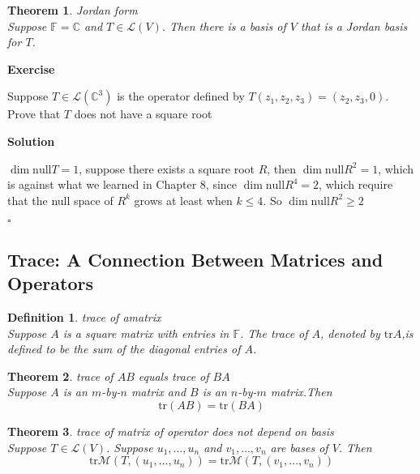 \documentclass{article}
\newtheorem{theorem}{Theorem}[subsection]
\newtheorem{definition}{Definition}[subsection]
\newenvironment{exercise}{%
{\textbf{Exercise\\}
    }
}{
}
\newenvironment{solution}{%
{
    \textbf{Solution\\}
    }
}{
  \hfill $\square$ 
  \par\bigskip 
}
\newcommand{\CC}{\mathbb{C}}
\newcommand{\FF}{\mathbb{F}}
\newcommand{\n}{\text{null}}
\newcommand{\tr}{\text{tr}}
\begin{document}
\begin{CJK}{UTF8}{gkai}
\begin{theorem}
    Jordan form\\
    
    Suppose $\FF = \CC$ and $T \in \mathcal{L}(V)$. Then there is a basis of $V$ that is a Jordan basis for $T$.
\end{theorem}

\begin{exercise}
    Suppose $T \in \mathcal{L}(\CC^3)$ is the operator defined by $T(z_1,z_2,z_3) = (z_2,z_3,0)$. Prove that $T$ does not have a square root
\end{exercise}

\begin{solution}
    $\dim \n T = 1$, suppose there exists a square root $R$, then $\dim \n R^2 = 1$, which is against what we learned in Chapter 8, since $\dim \n R^4 = 2$, which require that the null space of $R^k$ grows at least when $k \leq 4$. So $\dim \n R^2 \geq 2$
\end{solution}

\subsection{Trace: A Connection Between Matrices and Operators}

\begin{definition}
    trace of amatrix\\

    Suppose $A$ is a square matrix with entries in $\FF$. The trace of $A$, denoted by $\tr A$,is defined to be the sum of the diagonal entries of $A$.
\end{definition}

\begin{theorem}
    trace of $A B$ equals trace of $B A$\\

    Suppose $A$ is an $m$-by-$n$ matrix and $B$ is an $n$-by-$m$ matrix.Then
    \[\tr(A B )= \tr( B A)\]
\end{theorem}

\begin{theorem}
    trace of matrix of operator does not depend on basis\\

    Suppose $T \in \mathcal{L}(V)$. Suppose $u_1,\ldots,u_n$ and $v_1,\ldots,v_n$ are bases of $V$. Then
    \[\tr \mathcal{M}(T,(u_1,\ldots,u_n)) = \tr\mathcal{M}(T,(v_1,\ldots,v_n))\]
\end{theorem}


\end{CJK}
\end{document}
